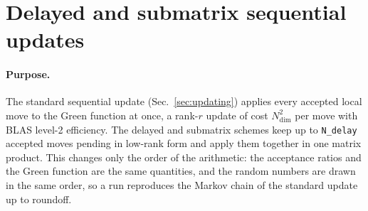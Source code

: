 \section{Delayed and submatrix sequential updates} \label{sec:lowrank}
%

\paragraph{Purpose.}
The standard sequential update (Sec.~\ref{sec:updating}) applies every accepted local move to the
Green function at once, a rank-$r$ update of cost $N_{\text{dim}}^2$ per move with BLAS level-2
efficiency. The delayed and submatrix schemes keep up to \texttt{N\_delay} accepted moves pending
in low-rank form and apply them together in one matrix product. This changes only the order of the
arithmetic: the acceptance ratios and the Green function are the same quantities, and the random
numbers are drawn in the same order, so a run reproduces the Markov chain of the standard update
up to roundoff.

